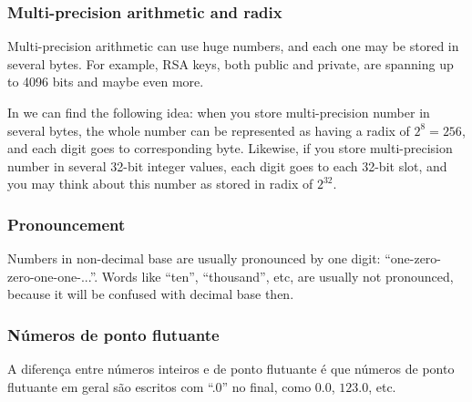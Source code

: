 \subsubsection{Multi-precision arithmetic and radix}

Multi-precision arithmetic can use huge numbers, and each one may be stored in several bytes.
For example, RSA keys, both public and private, are spanning up to 4096 bits and maybe even more.

In  we can find the following idea: when you store multi-precision number in several bytes,
the whole number can be represented as having a radix of $2^8=256$, and each digit goes to corresponding byte.
Likewise, if you store multi-precision number in several 32-bit integer values, each digit goes to each 32-bit slot,
and you may think about this number as stored in radix of $2^{32}$.

\subsubsection{Pronouncement}

Numbers in non-decimal base are usually pronounced by one digit: ``one-zero-zero-one-one-...''.
Words like ``ten'', ``thousand'', etc, are usually not pronounced, because it will be confused with decimal base then.

\subsubsection{Números de ponto flutuante}

A diferença entre números inteiros e de ponto flutuante é que números de ponto flutuante em geral são escritos com ``.0'' no final, como $0.0$, $123.0$, etc.